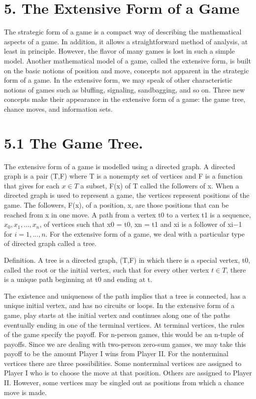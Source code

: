 \documentclass[]{report}
\begin{document}
\section{5. The Extensive Form of a Game}
The strategic form of a game is a compact way of describing the mathematical aspects
of a game. In addition, it allows a straightforward method of analysis, at least in principle.
However, the flavor of many games is lost in such a simple model. Another mathematical
model of a game, called the extensive form, is built on the basic notions of position and
move, concepts not apparent in the strategic form of a game. In the extensive form, we
may speak of other characteristic notions of games such as bluffing, signaling, sandbagging,
and so on. Three new concepts make their appearance in the extensive form of a game:
the game tree, chance moves, and information sets.
\section{5.1 The Game Tree.} The extensive form of a game is modelled using a directed
graph. A directed graph is a pair (T,F) where T is a nonempty set of vertices and F is
a function that gives for each $x \in T$ a subset, F(x) of T called the followers of x. When
a directed graph is used to represent a game, the vertices represent positions of the game.
The followers, F(x), of a position, x, are those positions that can be reached from x in one
move.
A path from a vertex t0 to a vertex t1 is a sequence, $x_0, x_1,...,x_n$, of vertices
such that x0 = t0, xn = t1 and xi is a follower of xi−1 for $i = 1,...,n$. For the extensive
form of a game, we deal with a particular type of directed graph called a tree.
\begin{framed}
Definition. A tree is a directed graph, (T,F) in which there is a special vertex, t0, called
the root or the initial vertex, such that for every other vertex $t \in T$, there is a unique path
beginning at t0 and ending at t.
\end{framed}
The existence and uniqueness of the path implies that a tree is connected, has a unique
initial vertex, and has no circuits or loops.
In the extensive form of a game, play starts at the initial vertex and continues along
one of the paths eventually ending in one of the terminal vertices. At terminal vertices,
the rules of the game specify the payoff. For n-person games, this would be an n-tuple of
payoffs. Since we are dealing with two-person zero-sum games, we may take this payoff to
be the amount Player I wins from Player II. For the nonterminal vertices there are three
possibilities. Some nonterminal vertices are assigned to Player I who is to choose the move
at that position. Others are assigned to Player II. However, some vertices may be singled
out as positions from which a chance move is made.
\end{document}
